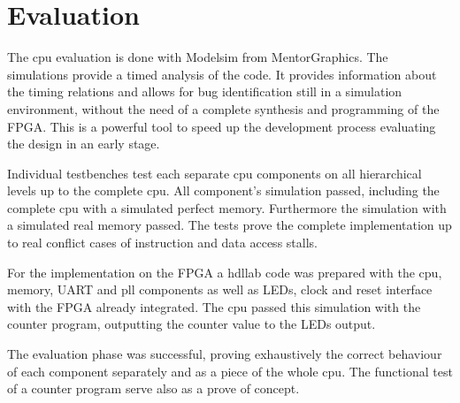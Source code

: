 \chapter{Evaluation}
The cpu evaluation is done with Modelsim from MentorGraphics. The simulations provide a timed analysis of the code. It provides information
about the timing relations and allows for bug identification still in a simulation environment, without the need of a complete synthesis
and programming of the FPGA. This is a powerful tool to speed up the development process evaluating the design in an early stage.

Individual testbenches test each separate cpu components on all hierarchical levels up to the complete cpu.
All component's simulation passed, including the complete cpu with a simulated perfect memory. Furthermore the
simulation with a simulated real memory passed. The tests prove the complete implementation up to real conflict cases of instruction and data access stalls.

For the implementation on the FPGA a hdllab code was prepared with the cpu, memory, UART and pll components as well as LEDs, clock and reset interface
with the FPGA already integrated. The cpu passed this simulation with the counter program, outputting the counter value to the LEDs output. 

The evaluation phase was successful, proving exhaustively the correct behaviour of each component separately and as a piece of the whole cpu. The functional
test of a counter program serve also as a prove of concept. 